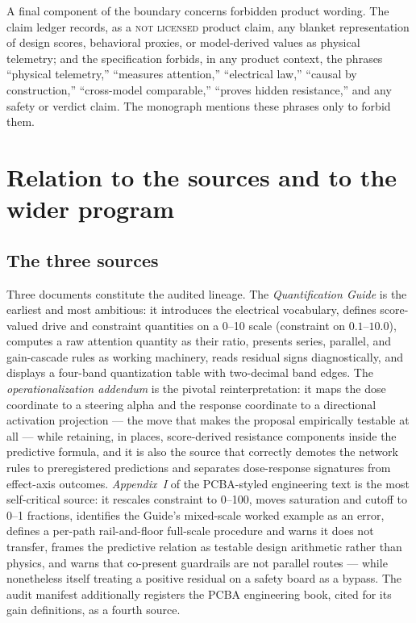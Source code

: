 A final component of the boundary concerns forbidden product wording. The claim ledger records, as a \textsc{not licensed} product claim, any blanket representation of design scores, behavioral proxies, or model-derived values as physical telemetry; and the specification forbids, in any product context, the phrases ``physical telemetry,'' ``measures attention,'' ``electrical law,'' ``causal by construction,'' ``cross-model comparable,'' ``proves hidden resistance,'' and any safety or verdict claim. The monograph mentions these phrases only to forbid them.

\section{Relation to the sources and to the wider program}\label{ch01:relation}

\subsection{The three sources}\label{ch01:relation:sources}

Three documents constitute the audited lineage. The \emph{Quantification Guide} is the earliest and most ambitious: it introduces the electrical vocabulary, defines score-valued drive and constraint quantities on a 0--10 scale (constraint on $0.1$--$10.0$), computes a raw attention quantity as their ratio, presents series, parallel, and gain-cascade rules as working machinery, reads residual signs diagnostically, and displays a four-band quantization table with two-decimal band edges. The \emph{operationalization addendum} is the pivotal reinterpretation: it maps the dose coordinate to a steering alpha and the response coordinate to a directional activation projection --- the move that makes the proposal empirically testable at all --- while retaining, in places, score-derived resistance components inside the predictive formula, and it is also the source that correctly demotes the network rules to preregistered predictions and separates dose-response signatures from effect-axis outcomes. \emph{Appendix~I} of the PCBA-styled engineering text is the most self-critical source: it rescales constraint to 0--100, moves saturation and cutoff to 0--1 fractions, identifies the Guide's mixed-scale worked example as an error, defines a per-path rail-and-floor full-scale procedure and warns it does not transfer, frames the predictive relation as testable design arithmetic rather than physics, and warns that co-present guardrails are not parallel routes --- while nonetheless itself treating a positive residual on a safety board as a bypass. The audit manifest additionally registers the PCBA engineering book, cited for its gain definitions, as a fourth source.

